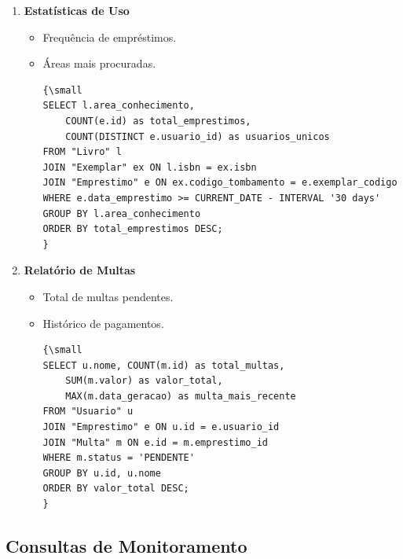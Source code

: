 \documentclass[12pt,a4paper]{article}
\begin{document}
\begin{tcolorbox}[title=Relatórios Gerenciais]
\begin{enumerate}[label=\textbf{RG\arabic*.}]
    \item \textbf{Estatísticas de Uso}
    \begin{itemize}
        \item Frequência de empréstimos.
        \item Áreas mais procuradas.
        \begin{verbatim}
{\small
SELECT l.area_conhecimento,
    COUNT(e.id) as total_emprestimos,
    COUNT(DISTINCT e.usuario_id) as usuarios_unicos
FROM "Livro" l
JOIN "Exemplar" ex ON l.isbn = ex.isbn
JOIN "Emprestimo" e ON ex.codigo_tombamento = e.exemplar_codigo
WHERE e.data_emprestimo >= CURRENT_DATE - INTERVAL '30 days'
GROUP BY l.area_conhecimento
ORDER BY total_emprestimos DESC;
}
        \end{verbatim}
    \end{itemize}

    \item \textbf{Relatório de Multas}
    \begin{itemize}
        \item Total de multas pendentes.
        \item Histórico de pagamentos.
        \begin{verbatim}
{\small
SELECT u.nome, COUNT(m.id) as total_multas,
    SUM(m.valor) as valor_total,
    MAX(m.data_geracao) as multa_mais_recente
FROM "Usuario" u
JOIN "Emprestimo" e ON u.id = e.usuario_id
JOIN "Multa" m ON e.id = m.emprestimo_id
WHERE m.status = 'PENDENTE'
GROUP BY u.id, u.nome
ORDER BY valor_total DESC;
}
        \end{verbatim}
    \end{itemize}
\end{enumerate}
\end{tcolorbox}

\subsection{Consultas de Monitoramento}
\end{document}
